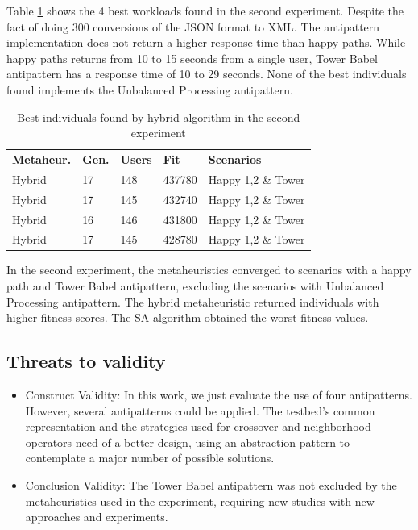 \documentclass[espaco=umemeio,chapter=TITLE,twoside,openright]{abnt}
\begin{document}
Table \ref{tab:bestindividuals2} shows the 4 best workloads found in the second experiment. Despite the fact of doing 300 conversions of the JSON format to XML. The antipattern implementation does not return a higher response time than happy paths. While happy paths returns from 10 to 15 seconds from a single user, Tower Babel antipattern has a response time of 10 to 29 seconds. None of the best individuals found implements the Unbalanced Processing antipattern.


\begin{table}[h]
\centering
\caption{Best individuals found by hybrid algorithm in the second experiment}
\label{tab:bestindividuals2}
\begin{tabular}{lllll}
\rowcolor[HTML]{FFCCC9}
\textbf{Metaheur.} & \textbf{Gen.} & \textbf{Users} & \textbf{Fit} & \textbf{Scenarios}  \\
\multicolumn{1}{l}{Hybrid} & \multicolumn{1}{l}{17} & \multicolumn{1}{l}{148} & \multicolumn{1}{l}{437780} & \multicolumn{1}{l}{Happy 1,2 \& Tower}  \\
\multicolumn{1}{l}{Hybrid} & \multicolumn{1}{l}{17} & \multicolumn{1}{l}{145} & \multicolumn{1}{l}{432740} & \multicolumn{1}{l}{Happy 1,2 \& Tower}  \\
\multicolumn{1}{l}{Hybrid} & \multicolumn{1}{l}{16} & \multicolumn{1}{l}{146} & \multicolumn{1}{l}{431800} & \multicolumn{1}{l}{Happy 1,2 \& Tower} \\
\multicolumn{1}{l}{Hybrid} & \multicolumn{1}{l}{17} & \multicolumn{1}{l}{145} & \multicolumn{1}{l}{428780} & \multicolumn{1}{l}{Happy 1,2 \& Tower}  \\
\end{tabular}
\end{table}

In the second experiment, the metaheuristics converged to scenarios with a happy path and Tower Babel antipattern, excluding the scenarios with Unbalanced Processing antipattern. The hybrid metaheuristic returned individuals with higher fitness scores. The SA algorithm obtained the worst fitness values.

\subsection{Threats to validity}
\begin{itemize}
\item Construct Validity:
In this work, we just evaluate the use of four antipatterns. However, several antipatterns could be applied.  The testbed's common representation and the strategies used for crossover and neighborhood operators need of a better design, using an abstraction pattern to contemplate a major number of possible solutions.
\item Conclusion Validity:
The Tower Babel antipattern was not excluded by the metaheuristics used in the experiment, requiring new studies with new approaches and experiments.
\end{itemize}
\end{document}
